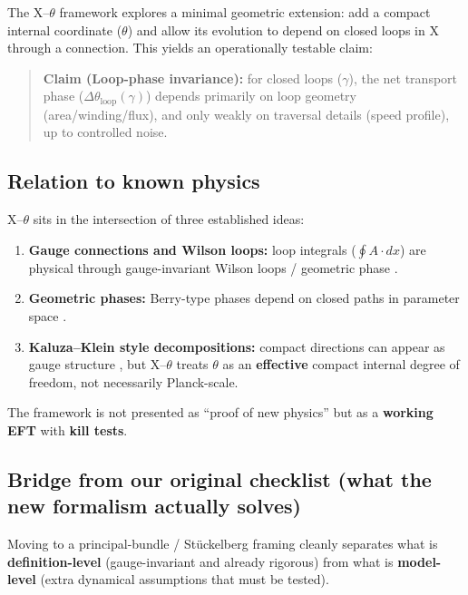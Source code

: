﻿\documentclass[twocolumn,aps,prd,nofootinbib]{revtex4-2}
\begin{document}
The X--$\theta$ framework explores a minimal geometric extension: add a compact internal coordinate ($\theta$) and allow its evolution to depend on closed loops in X through a connection. This yields an operationally testable claim:

\begin{quote}
        	\textbf{Claim (Loop-phase invariance):} for closed loops ($\gamma$), the net transport phase ($\Delta\theta_{\mathrm{loop}}(\gamma)$) depends primarily on loop geometry (area/winding/flux), and only weakly on traversal details (speed profile), up to controlled noise.
\end{quote}

\subsection{Relation to known physics}
X--$\theta$ sits in the intersection of three established ideas:
\begin{enumerate}
    \item \textbf{Gauge connections and Wilson loops:} loop integrals ($\oint A\cdot dx$) are physical through gauge-invariant Wilson loops / geometric phase \cite{Wilson1974,Nakahara2003,AharonovBohm1959}.
    \item \textbf{Geometric phases:} Berry-type phases depend on closed paths in parameter space \cite{Berry1984}.
    \item \textbf{Kaluza--Klein style decompositions:} compact directions can appear as gauge structure \cite{Kaluza1921, Klein1926}, but X--$\theta$ treats $\theta$ as an \textbf{effective} compact internal degree of freedom, not necessarily Planck-scale.
\end{enumerate}
The framework is not presented as ``proof of new physics'' but as a \textbf{working EFT} with \textbf{kill tests}.

\subsection{Bridge from our original checklist (what the new formalism actually solves)}
Moving to a principal-bundle / St\"uckelberg framing cleanly separates what is \textbf{definition-level} (gauge-invariant and already rigorous) from what is \textbf{model-level} (extra dynamical assumptions that must be tested).
\end{document}
